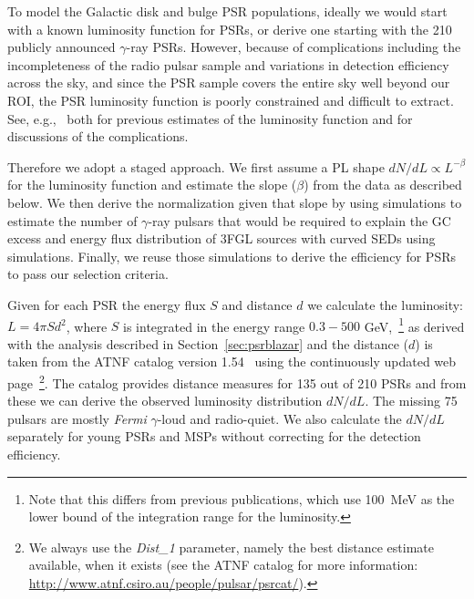 \documentclass[iop]{emulateapj}
\begin{document}
To model the Galactic disk and bulge PSR populations, ideally we would
start with a known luminosity function for PSRs, or derive one starting with the 210 publicly
announced $\gamma$-ray PSRs.   However, because of complications
including the incompleteness of the radio pulsar sample and variations in
detection efficiency across the sky, and since the PSR sample 
covers the entire sky well beyond our ROI, the PSR
luminosity function is poorly constrained and difficult to extract.
See, e.g.,~\citet{Strong:2006hf,Cholis:2014noa,Petrovic:2014xra,Bartels:2015aea} both for previous 
estimates of the luminosity function and for discussions of the complications. 


Therefore we adopt a staged approach.  We first assume a PL
shape $dN/dL\propto L^{-\beta}$ for the luminosity function and
estimate the slope ($\beta$) from the data as described below.  We
then derive the normalization given that slope by using simulations
to estimate the number of $\gamma$-ray
pulsars that would be required to explain the GC excess and energy
flux distribution of 3FGL sources with curved SEDs using
simulations.  Finally, we reuse those simulations to derive the
efficiency for PSRs to pass our selection criteria.

Given for each PSR the energy flux $S$ and distance $d$ we calculate
the luminosity: $L = 4\pi S d^{2}$, where $S$ is 
 integrated in the energy range $0.3-500$ GeV,~\footnote[9]{Note that this
    differs from previous publications, which use 100~MeV as the lower
    bound of the integration range for the luminosity.} as derived with the analysis
  described in Section~\ref{sec:psrblazar} and the distance ($d$) is
  taken from the ATNF catalog version 1.54~\citep{2005AJ....129.1993M}  using the
continuously updated web page~\footnote[10]{We always use the
    {\it Dist\_1} parameter, namely the best distance estimate
    available, when it exists (see the ATNF catalog for more
    information:
    \url{http://www.atnf.csiro.au/people/pulsar/psrcat/}).}.  The
catalog provides distance measures for 135 out of 210 PSRs and from
these we can derive the observed luminosity distribution $dN/dL$. The
missing 75 pulsars are mostly {\it Fermi} $\gamma$-loud and
radio-quiet.  We also calculate the $dN/dL$ separately for young
PSRs and MSPs without correcting for the detection
efficiency.   
\end{document}
